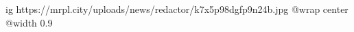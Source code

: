  
 
 
 
 

\ifcmt
  ig https://mrpl.city/uploads/news/redactor/k7x5p98dgfp9n24b.jpg
  @wrap center
  @width 0.9
\fi
